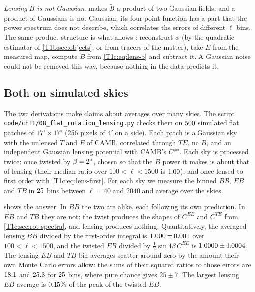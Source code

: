 \emph{Lensing $B$ is not Gaussian.}  makes $\tilde B$ a product of two Gaussian fields, and a product of Gaussians is not Gaussian: its four-point function has a part that the power spectrum does not describe, which correlates the errors of different $\ell$ bins. The same product structure is what allows  \cite{LewisChallinor2006}: reconstruct $\phi$ (by the quadratic estimator of \cref{T1b:sec:objects}, or from tracers of the matter), take $E$ from the measured map, compute $\tilde B$ from \eqref{T1c:eq:lens-b} and subtract it. A Gaussian noise could not be removed this way, because nothing in the data predicts it.

\subsection{Both on simulated skies}
\label{T1c:sec:rot-sims}

The two derivations make claims about averages over many skies. The script \nolinkurl{code/chT1/08_flat_rotation_lensing.py} checks them on $500$ simulated flat patches of $17^\circ\times17^\circ$ (256 pixels of $4'$ on a side). Each patch is a Gaussian sky with the unlensed $T$ and $E$ of CAMB, correlated through $TE$, no $B$, and an independent Gaussian lensing potential with CAMB's $C^{\phi\phi}$. Each sky is processed twice: once twisted by $\beta=2^\circ$, chosen so that the $B$ power it makes is about that of lensing (their median ratio over $100<\ell<1500$ is $1.00$), and once lensed to first order with \eqref{T1c:eq:lens-first}. For each sky we measure the binned $BB$, $EB$ and $TB$ in $25$ bins between $\ell=40$ and $2040$ and average over the skies.

 shows the answer. In $BB$ the two are alike, each following its own prediction. In $EB$ and $TB$ they are not: the twist produces the shapes of $C^{EE}$ and $C^{TE}$ from \cref{T1c:sec:rot-spectra}, and lensing produces nothing. Quantitatively, the averaged lensing $BB$ divided by the first-order integral is $1.000\pm0.001$ over $100<\ell<1500$, and the twisted $EB$ divided by $\frac12\sin4\beta\,C^{EE}$ is $1.0000\pm0.0004$. The lensing $EB$ and $TB$ bin averages scatter around zero by the amount their own Monte Carlo errors allow: the sums of their squared ratios to those errors are $18.1$ and $25.3$ for $25$ bins, where pure chance gives $25\pm7$. The largest lensing $EB$ average is $0.15\%$ of the peak of the twisted $EB$.

